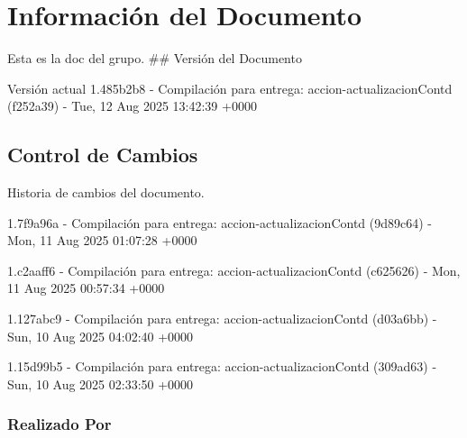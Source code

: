 \documentclass[
	a4paper, %
	12pt, %
]{include/CSSullivanBusinessReport}
\begin{document}
\newpage

\begin{twothirdswidth} %
	\tableofcontents %
\end{twothirdswidth}

\newpage


\newpage

\section{Información del
Documento}\label{sec:informaciuxf3n-del-documento}

Esta es la doc del grupo. \#\# Versión del Documento

\begin{quote}
\end{quote}

Versión actual 1.485b2b8 - Compilación para entrega:
accion-actualizacionContd (f252a39) - Tue, 12 Aug 2025 13:42:39 +0000

\subsection{Control de Cambios}\label{sec:control-de-cambios}

Historia de cambios del documento.

1.7f9a96a - Compilación para entrega: accion-actualizacionContd
(9d89c64) - Mon, 11 Aug 2025 01:07:28 +0000

1.c2aaff6 - Compilación para entrega: accion-actualizacionContd
(c625626) - Mon, 11 Aug 2025 00:57:34 +0000

1.127abc9 - Compilación para entrega: accion-actualizacionContd
(d03a6bb) - Sun, 10 Aug 2025 04:02:40 +0000

1.15d99b5 - Compilación para entrega: accion-actualizacionContd
(309ad63) - Sun, 10 Aug 2025 02:33:50 +0000

\subsubsection{Realizado Por}\label{sec:realizado-por}
\end{document}
